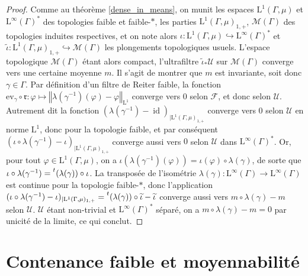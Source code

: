 \documentclass[a4paper,12pt]{article}
\newcommand{\ev}{\mathrm{ev}}
\newcommand{\norm}[1]{\left\Vert #1\right\Vert}
\newcommand{\transpose}[1]{\prescript{t}{}{#1}{}{}}
\newcommand{\inv}{^{-1}}
\newcommand{\comp}{\circ}
\DeclareMathOperator{\id}{id}
\begin{document}
\begin{proof}
    Comme au théorème \ref{dense_in_means}, on munit les espaces $\mathrm{L}^1(\Gamma, \mu)$ et $\mathrm{L}^\infty(\Gamma)^*$ des topologies faible et faible-$*$,
    les parties $\mathrm{L}^1(\Gamma, \mu)_{1, +}$, $\mathcal{M}(\Gamma)$ des topologies induites respectives, et on note alors
    $\iota:\mathrm{L}^1(\Gamma, \mu)\hookrightarrow\mathrm{L}^\infty(\Gamma)^*$ et $\widetilde{\iota}:\mathrm{L}^1(\Gamma, \mu)_{1, +}\hookrightarrow \mathcal{M}(\Gamma)$
    les plongements topologiques usuels. L'espace topologique $\mathcal{M}(\Gamma)$ étant alors compact,
    l'ultrafiltre $\widetilde{\iota}_*\mathscr{U}$ sur $\mathcal{M}(\Gamma)$ converge vers une certaine moyenne $m$. Il s'agit de montrer que $m$ est invariante,
    soit donc $\gamma\in\Gamma$. Par définition d'un filtre de Reiter faible, la fonction $\ev_\gamma\comp\mathfrak{r}:\varphi\mapsto\norm{\lambda(\gamma\inv)(\varphi)-\varphi}_{\mathrm{L}^1}$
    converge vers $0$ selon $\mathscr{F}$, et donc selon $\mathscr{U}$. Autrement dit la 
    fonction $(\lambda(\gamma\inv)-\id)_{|\mathrm{L}^1(\Gamma, \mu)_{1, +}}$ converge vers $0$ selon $\mathscr{U}$
    en norme $\mathrm{L}^1$, donc pour la topologie faible, et par conséquent $(\iota\comp\lambda(\gamma\inv)-\iota)_{|\mathrm{L}^1(\Gamma, \mu)_{1, +}}$ converge 
    aussi vers $0$ selon $\mathscr{U}$ dans $\mathrm{L}^\infty(\Gamma)^*$. Or, pour tout
    $\varphi\in\mathrm{L}^1(\Gamma, \mu)$, on a $\iota(\lambda(\gamma\inv)(\varphi))=\iota(\varphi)\comp\lambda(\gamma)$, de sorte que 
    $\iota\comp\lambda(\gamma\inv) = \transpose{(\lambda(\gamma))}\comp\iota$.
    La transposée de l'isométrie $\lambda(\gamma):\mathrm{L}^\infty(\Gamma)\to\mathrm{L}^\infty(\Gamma)$ est continue 
    pour la topologie faible-$*$, donc l'application $(\iota\comp\lambda(\gamma\inv)-\iota)_{|\mathrm{L}^1(\Gamma, \mu)_{1, +}} = \transpose{(\lambda(\gamma))}\comp\widetilde{\iota} - \widetilde{\iota}$
    converge aussi vers $m\comp\lambda(\gamma)-m$ selon $\mathscr{U}$.
    $\mathscr{U}$ étant non-trivial et $\mathrm{L}^\infty(\Gamma)^*$ séparé, on a $m\comp\lambda(\gamma)-m = 0$ par unicité de la limite, ce qui conclut.
\end{proof}

\section{Contenance faible et moyennabilité}
\end{document}
